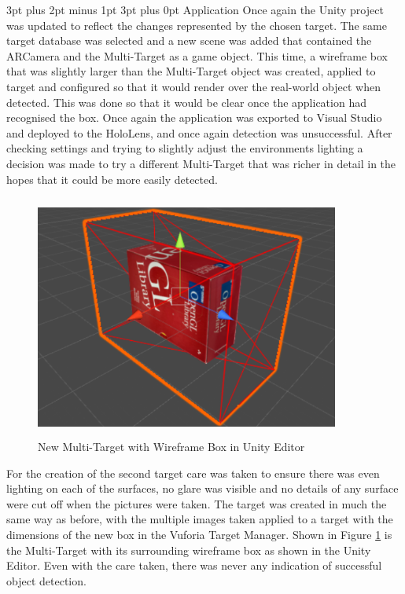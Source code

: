 \documentclass[12pt,a4paper,oneside]{article}
\makeatletter
\renewcommand\paragraph{\@startsection {paragraph}{1}{0mm} %
	                           {3pt plus 2pt minus 1pt} %
	                           {3pt plus 0pt} %
	                           {\normalfont}}
\makeatother
\begin{document}
\paragraph{Application}
Once again the Unity project was updated to reflect the changes represented by the chosen target. The same target database was selected and a new scene was added that contained the ARCamera and the Multi-Target as a game object. This time, a wireframe box that was slightly larger than the Multi-Target object was created, applied to target and configured so that it would render over the real-world object when detected. This was done so that it would be clear once the application had recognised the box. Once again the application was exported to Visual Studio and deployed to the HoloLens, and once again detection was unsuccessful. After checking settings and trying to slightly adjust the environments lighting a decision was made to try a different Multi-Target that was richer in detail in the hopes that it could be more easily detected.

\begin{figure}[!h]
	\centering
	\includegraphics[width=10cm,height=8cm,keepaspectratio]{images/openglbox}
	\caption[Multi-Target with Wireframe Box in Unity]{New Multi-Target with Wireframe Box in Unity Editor}
	\label{fig_openglbox}
\end{figure}

For the creation of the second target care was taken to ensure there was even lighting on each of the surfaces, no glare was visible and no details of any surface were cut off when the pictures were taken. The target was created in much the same way as before, with the multiple images taken applied to a target with the dimensions of the new box in the Vuforia Target Manager. Shown in Figure \ref{fig_openglbox} is the Multi-Target with its surrounding wireframe box as shown in the Unity Editor. Even with the care taken, there was never any indication of successful object detection.
\end{document}

